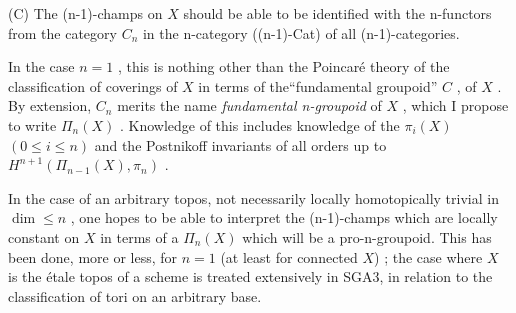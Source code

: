 \documentclass[11pt]{article}
\newcommand{\scanpage}[1]{\par\bigskip\noindent{\small\sffamily[scan #1]}\par}
\newcommand{\mspage}[1]{{\small\sffamily[p.\,#1]}}
\begin{document}
(C) The (n-1)-champs on $X$ should be able to be identified with the
n-functors from the category $C_{n}$ in the n-category ((n-1)-Cat) of all
(n-1)-categories.

In the case $n = 1$ , this is nothing other than the Poincaré theory of
the classification of coverings of $X$ in terms of the``fundamental groupoid''
$C$ , of $X$ . By extension, $C_{n}$ merits the name \textit{fundamental n-groupoid} of $X$ ,
which I propose to write $\Pi_{n}(X)$ . Knowledge of this includes knowledge of
the $\pi_{i}(X)$ $(0 \leq i \leq n)$ and the Postnikoff invariants of all orders up to
$H^{n+1}(\Pi_{n-1}(X), \pi_{n})$ .

In the case of an arbitrary topos, not necessarily locally homotopically
trivial in $\dim \leq n$ , one hopes to be able to interpret the (n-1)-champs which
are locally constant on $X$ in terms of a $\Pi_{n}(X)$ which will be a pro-n-groupoid.
This has been done, more or less, for $n = 1$ (at least for connected $X$) ;
the case where $X$ is the étale topos of a scheme is treated extensively in
SGA3, in relation to the classification of tori on an arbitrary base.

\mspage{123}

\clearpage
\scanpage{134-2/123}
\mspage{- 2 -}
\end{document}
